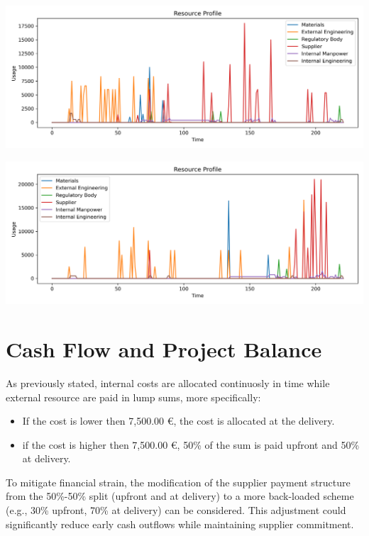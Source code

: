 \documentclass[12pt]{article}
\begin{document}
\begin{minipage}{0.48\textwidth}
        \centering
        \includegraphics[width=\textwidth]{../resource_profile_E.png}
        \label{fig:resource_profile_early}
\end{minipage}\hfill
\begin{minipage}{0.48\textwidth}
        \centering
        \includegraphics[width=\textwidth]{../resource_profile_L.png}
        \label{fig:resource_profile_late}
\end{minipage}

\section{Cash Flow and Project Balance}
As previously stated, internal costs are allocated continuosly in time while external resource are paid in lump sums, more specifically:
\begin{itemize}
        \item If the cost is lower then 7,500.00 €, the cost is allocated at the delivery.
        \item if the cost is higher then 7,500.00 €, 50\% of the sum is paid upfront and 50\% at delivery.
\end{itemize}

To mitigate financial strain, the modification of the supplier payment structure from the 50\%-50\% split (upfront and at delivery) to a more back-loaded scheme (e.g., 30\% upfront, 70\% at delivery) can be considered.
This adjustment could significantly reduce early cash outflows while maintaining supplier commitment.
\end{document}

